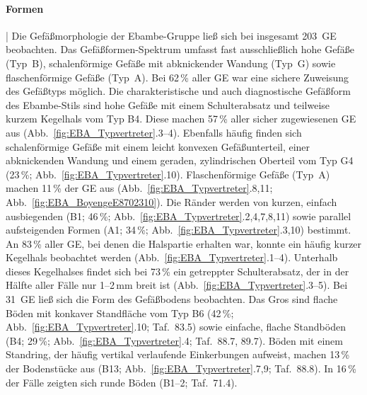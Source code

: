 \paragraph{Formen}\hspace{-.5em}|\hspace{.5em}%
Die Gefäßmorphologie der Ebambe-Gruppe ließ sich bei insgesamt 203~GE beobachten. Das Gefäßformen-Spektrum umfasst fast ausschließlich hohe Gefäße (Typ~B), schalenförmige Gefäße mit abknickender Wandung (Typ~G) sowie flaschenförmige Gefäße (Typ~A). Bei 62\,\% aller GE war eine sichere Zuweisung des Gefäßtyps möglich. Die charakteristische und auch diagnostische Gefäßform des Ebambe-Stils sind hohe Gefäße mit einem Schulterabsatz und teilweise kurzem Kegelhals vom Typ B4. Diese machen 57\,\% aller sicher zugewiesenen GE aus (Abb.~\ref{fig:EBA_Typvertreter}.3--4). Ebenfalls häufig finden sich schalenförmige Gefäße mit einem leicht konvexen Gefäßunterteil, einer abknickenden Wandung und einem geraden, zylindrischen Oberteil vom Typ G4 (23\,\%; Abb.~\ref{fig:EBA_Typvertreter}.10). Flaschenförmige Gefäße (Typ~A) machen 11\,\% der GE aus (Abb.~\ref{fig:EBA_Typvertreter}.8,11; Abb.~\ref{fig:EBA_BoyengeE8702310}). Die Ränder werden von kurzen, einfach ausbiegenden (B1; 46\,\%; Abb.~\ref{fig:EBA_Typvertreter}.2,4,7,8,11) sowie parallel aufsteigenden Formen (A1; 34\,\%; Abb.~\ref{fig:EBA_Typvertreter}.3,10) bestimmt. An 83\,\% aller GE, bei denen die Halspartie erhalten war, konnte ein häufig kurzer Kegelhals beobachtet werden (Abb.~\ref{fig:EBA_Typvertreter}.1--4). Unterhalb dieses Kegelhalses findet sich bei 73\,\% ein getreppter Schulterabsatz, der in der Hälfte aller Fälle nur 1--2\,mm breit ist (Abb.~\ref{fig:EBA_Typvertreter}.3--5). Bei 31~GE ließ sich die Form des Gefäßbodens beobachten. Das Gros sind flache Böden mit konkaver Standfläche vom Typ B6 (42\,\%; Abb.~\ref{fig:EBA_Typvertreter}.10; Taf.~83.5) sowie einfache, flache Standböden (B4; 29\,\%; Abb.~\ref{fig:EBA_Typvertreter}.4; Taf.~88.7, 89.7). Böden mit einem Standring, der häufig vertikal verlaufende Einkerbungen aufweist, machen 13\,\% der Bodenstücke aus (B13; Abb.~\ref{fig:EBA_Typvertreter}.7,9; Taf.~88.8). In 16\,\% der Fälle zeigten sich runde Böden (B1--2; Taf.~71.4).

